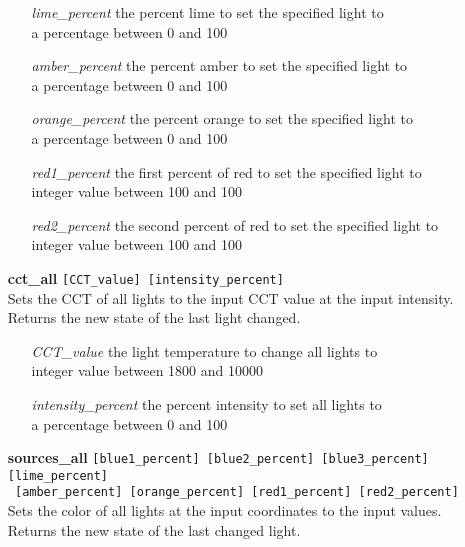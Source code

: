 \documentclass[twoside]{article}
\begin{document}
\begin{enumerate}
\begin{enumerate}[leftmargin=3\parindent]
			\item[{\it lime\_percent}] the percent lime to set the specified light to\\
			a percentage between 0 and 100
			\item[{\it amber\_percent}] the percent amber to set the specified light to\\
			a percentage between 0 and 100
			\item[{\it orange\_percent}] the percent orange to set the specified light to\\
			a percentage between 0 and 100
			
			\item[{\it red1\_percent}] the first percent of red to set the specified light to\\
			integer value between 100 and 100
			\item[{\it red2\_percent}] the second percent of red to set the specified light to\\
			integer value between 100 and 100
		\end{enumerate}
		
		\item[\bf cct\_all] \verb|[CCT_value] [intensity_percent]|\\
		Sets the CCT of all lights to the input CCT value at the input intensity.\\
		Returns the new state of the last light changed.
		
		\begin{enumerate}[leftmargin=3\parindent]
			\item[{\it CCT\_value}] the light temperature to change all lights to\\
			integer value between 1800 and 10000
			\item[{\it intensity\_percent}] the percent intensity to set all lights to\\
			a percentage between 0 and 100
		\end{enumerate}
	
		\item[\bf sources\_all] \verb|[blue1_percent] [blue2_percent] [blue3_percent] [lime_percent]|\\
		\verb| [amber_percent] [orange_percent] [red1_percent] [red2_percent]|\\
		Sets the color of all lights at the input coordinates to the input values.\\
		Returns the new state of the last changed light.
		

\end{enumerate}
\end{document}
